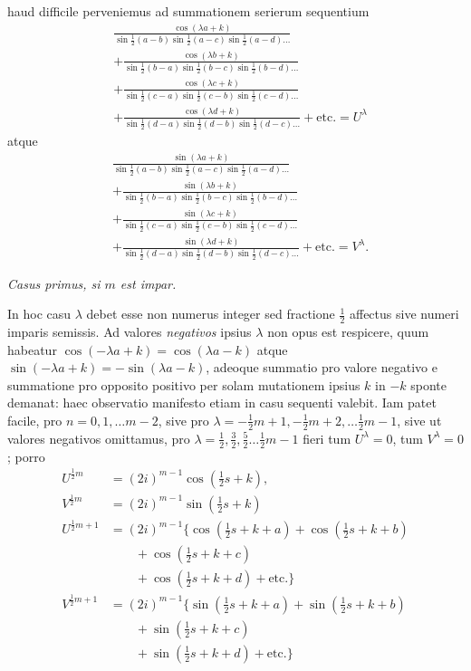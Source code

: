 haud difficile perveniemus ad summationem serierum sequentium
\[
\begin{aligned}
&\frac{\cos(\lambda a+k)}{\sin\tfrac12(a-b)\sin\tfrac12(a-c)\sin\tfrac12(a-d)\ldots}\\
&+\frac{\cos(\lambda b+k)}{\sin\tfrac12(b-a)\sin\tfrac12(b-c)\sin\tfrac12(b-d)\ldots}\\
&+\frac{\cos(\lambda c+k)}{\sin\tfrac12(c-a)\sin\tfrac12(c-b)\sin\tfrac12(c-d)\ldots}\\
&+\frac{\cos(\lambda d+k)}{\sin\tfrac12(d-a)\sin\tfrac12(d-b)\sin\tfrac12(d-c)\ldots}+\text{etc.}=U^\lambda
\end{aligned}
\]
atque
\[
\begin{aligned}
&\frac{\sin(\lambda a+k)}{\sin\tfrac12(a-b)\sin\tfrac12(a-c)\sin\tfrac12(a-d)\ldots}\\
&+\frac{\sin(\lambda b+k)}{\sin\tfrac12(b-a)\sin\tfrac12(b-c)\sin\tfrac12(b-d)\ldots}\\
&+\frac{\sin(\lambda c+k)}{\sin\tfrac12(c-a)\sin\tfrac12(c-b)\sin\tfrac12(c-d)\ldots}\\
&+\frac{\sin(\lambda d+k)}{\sin\tfrac12(d-a)\sin\tfrac12(d-b)\sin\tfrac12(d-c)\ldots}+\text{etc.}=V^\lambda.
\end{aligned}
\]
\begin{center}\textit{Casus primus, si $m$ est impar.}\end{center}
In hoc casu $\lambda$ debet esse non numerus integer sed fractione $\frac12$ affectus sive numeri imparis semissis. Ad valores \textit{negativos} ipsius $\lambda$ non opus est respicere, quum habeatur $\cos(-\lambda a+k)=\cos(\lambda a-k)$ atque $\sin(-\lambda a+k)=-\sin(\lambda a-k)$, adeoque summatio pro valore negativo e summatione pro opposito positivo per solam mutationem ipsius $k$ in $-k$ sponte demanat: haec observatio manifesto etiam in casu sequenti valebit. Iam patet facile, pro $n=0,1,\ldots m-2$, sive pro $\lambda=-\frac12m+1,-\frac12m+2,\ldots\frac12m-1$, sive ut valores negativos omittamus, pro $\lambda=\frac12,\frac32,\frac52\ldots\frac12m-1$ fieri tum $U^\lambda=0$, tum $V^\lambda=0$; porro
\[
\begin{aligned}
U^{\frac12m}&=(2i)^{m-1}\cos(\tfrac12s+k),\\V^{\frac12m}&=(2i)^{m-1}\sin(\tfrac12s+k)\\
U^{\frac12m+1}&=(2i)^{m-1}\{\cos(\tfrac12s+k+a)+\cos(\tfrac12s+k+b)\\&\qquad+\cos(\tfrac12s+k+c)\\
&\qquad+\cos(\tfrac12s+k+d)+\text{etc.}\}\\
V^{\frac12m+1}&=(2i)^{m-1}\{\sin(\tfrac12s+k+a)+\sin(\tfrac12s+k+b)\\&\qquad+\sin(\tfrac12s+k+c)\\
&\qquad+\sin(\tfrac12s+k+d)+\text{etc.}\}
\end{aligned}
\]
